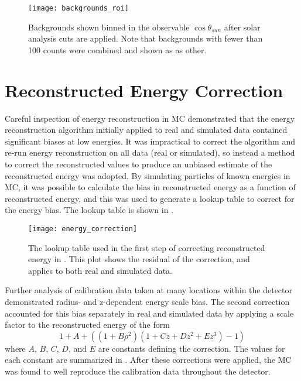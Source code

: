 \begin{figure}
\centering
\texttt{[image: backgrounds\_roi]}
\caption{Backgrounds shown binned in the observable $\cos{\theta_{sun}}$ after solar analysis cuts are applied.
Note that backgrounds with fewer than 100 counts were combined and shown as as other.}
\label{fig:solar:backgrounds}
\end{figure}

\clearpage 

\section{Reconstructed Energy Correction}

Careful inspection of energy reconstruction in MC demonstrated that the energy reconstruction algorithm initially applied to real and simulated data contained significant biases at low energies.
It was impractical to correct the algorithm and re-run energy reconstruction on all data (real or simulated), so instead a method to correct the reconstructed values to produce an unbiased estimate of the reconstructed energy was adopted.
By simulating particles of known energies in MC, it was possible to calculate the bias in reconstructed energy as a function of reconstructed energy, and this was used to generate a lookup table to correct for the energy bias.
The lookup table is shown in .

\begin{figure}
\centering
\texttt{[image: energy\_correction]}
\caption{\label{fig:energy_lookup}The lookup table used in the first step of correcting reconstructed energy in {\snop}. This plot shows the residual of the correction, and applies to both real and simulated data.}
\end{figure}

Further analysis of \N calibration data taken at many locations within the detector demonstrated radius- and z-dependent energy scale bias.
The second correction accounted for this bias separately in real and simulated data by applying a scale factor to the reconstructed energy of the form
\begin{equation}
1 + A + ( (1 + B \rho^2)(1 + Cz + Dz^2 + Ez^3) - 1 )
\end{equation}
where $A$, $B$, $C$, $D$, and $E$ are constants defining the correction.
The values for each constant are summarized in .
After these corrections were applied, the MC was found to well reproduce the \N calibration data throughout the detector.

